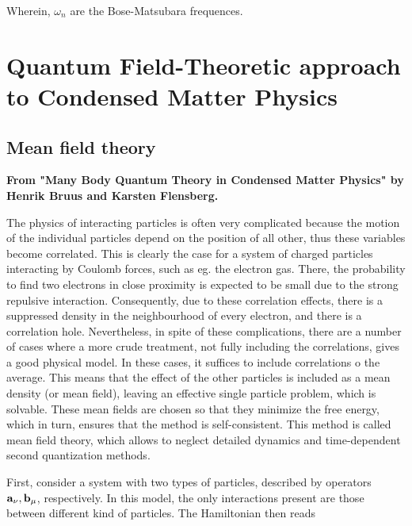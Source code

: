\documentclass{homework}
\begin{document}
Wherein, $\omega_n$ are the Bose-Matsubara frequences. 

\clearpage

\section{\textbf{Quantum Field-Theoretic approach to Condensed Matter Physics}}

\subsection{Mean field theory}

\textbf{From "Many Body Quantum Theory in Condensed Matter Physics" by Henrik Bruus and Karsten Flensberg.}

\begin{tcolorbox}[colback = yellow, title = Physical Context]

The physics of interacting particles is often very complicated because the motion of the individual particles depend on the position of all other, thus these variables become correlated. This is clearly the case for a system of charged particles interacting by Coulomb forces, such as eg. the electron gas. There, the probability to find two electrons in close proximity is expected to be small due to the strong repulsive interaction. Consequently, due to these correlation effects, there is a suppressed density in the neighbourhood of every electron, and there is a correlation hole. 
Nevertheless, in spite of these complications, there are a number of cases where a more crude treatment, not fully including the correlations, gives a good physical model. In these cases, it suffices to include correlations o the average. This means that the effect of the other particles is included as a mean density (or mean field), leaving an effective single particle problem, which is solvable. These mean fields are chosen so that they minimize the free energy, which in turn, ensures that the method is self-consistent. This method is called mean field theory, which allows to neglect detailed dynamics and time-dependent second quantization methods. \\

\end{tcolorbox}


First, consider a system with two types of particles, described by operators ${\bf a}_\nu, {\bf b}_{\mu}$, respectively. In this model, the only interactions present are those between different kind of particles. The Hamiltonian then reads
\end{document}
